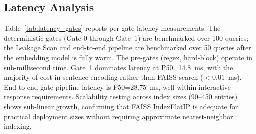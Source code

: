 \documentclass[journal]{IEEEtran}
\begin{document}
\subsection{Latency Analysis}
\label{Sect:Latency}

Table~\ref{tab:latency_gates} reports per-gate latency measurements. The deterministic gates (Gate 0 through Gate~1) are benchmarked over 100 queries; the Leakage Scan and end-to-end pipeline are benchmarked over 50 queries after the embedding model is fully warm. The pre-gates (regex, hard-block) operate in sub-millisecond time. Gate~1 dominates latency at P50=14.8~ms, with the majority of cost in sentence encoding rather than FAISS search ($<0.01$~ms). End-to-end gate pipeline latency is P50=28.75~ms, well within interactive response requirements. Scalability testing across index sizes (90--450 entries) shows sub-linear growth, confirming that FAISS IndexFlatIP is adequate for practical deployment sizes without requiring approximate nearest-neighbor indexing.

\begin{table}[!t]
\centering
\caption{Per-Gate Latency Benchmark (CPU inference). Gate 0 Decode through Gate~1 measured over $n{=}100$ queries; Leakage Scan and End-to-end measured over $n{=}50$ queries (model warm after Gate~1 runs). P99 equals the observed maximum in each sample due to small $n$.}
\label{tab:latency_gates}
\end{table}
\end{document}
